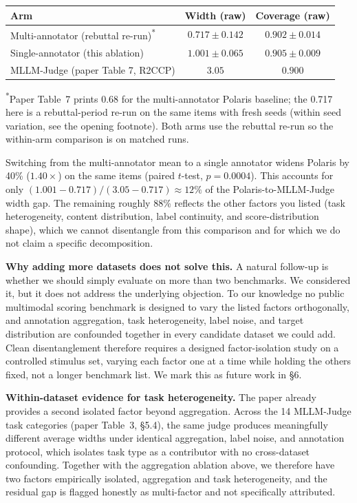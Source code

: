 \documentclass[11pt]{article}
\begin{document}
\begin{center}
\small
\begin{tabular}{lcc}
\toprule
\textbf{Arm} & \textbf{Width (raw)} & \textbf{Coverage (raw)} \\
\midrule
Multi-annotator (rebuttal re-run)\textsuperscript{*} & $0.717 \pm 0.142$ & $0.902 \pm 0.014$ \\
Single-annotator (this ablation)                     & $1.001 \pm 0.065$ & $0.905 \pm 0.009$ \\
MLLM-Judge (paper Table 7, R2CCP)                    & $3.05$            & $0.900$ \\
\bottomrule
\end{tabular}
\end{center}
\footnotesize\textsuperscript{*}Paper Table~7 prints 0.68 for the multi-annotator Polaris baseline; the 0.717 here is a rebuttal-period re-run on the same items with fresh seeds (within seed variation, see the opening footnote). Both arms use the rebuttal re-run so the within-arm comparison is on matched runs.\normalsize

Switching from the multi-annotator mean to a single annotator widens Polaris by 40\% ($1.40\times$) on the same items (paired $t$-test, $p = 0.0004$). This accounts for only $(1.001 - 0.717)/(3.05 - 0.717) \approx 12\%$ of the Polaris-to-MLLM-Judge width gap. The remaining roughly 88\% reflects the other factors you listed (task heterogeneity, content distribution, label continuity, and score-distribution shape), which we cannot disentangle from this comparison and for which we do not claim a specific decomposition.

\textbf{Why adding more datasets does not solve this.} A natural follow-up is whether we should simply evaluate on more than two benchmarks. We considered it, but it does not address the underlying objection. To our knowledge no public multimodal scoring benchmark is designed to vary the listed factors orthogonally, and annotation aggregation, task heterogeneity, label noise, and target distribution are confounded together in every candidate dataset we could add. Clean disentanglement therefore requires a designed factor-isolation study on a controlled stimulus set, varying each factor one at a time while holding the others fixed, not a longer benchmark list. We mark this as future work in \S 6.

\textbf{Within-dataset evidence for task heterogeneity.} The paper already provides a second isolated factor beyond aggregation. Across the 14 MLLM-Judge task categories (paper Table~3, \S 5.4), the same judge produces meaningfully different average widths under identical aggregation, label noise, and annotation protocol, which isolates task type as a contributor with no cross-dataset confounding. Together with the aggregation ablation above, we therefore have two factors empirically isolated, aggregation and task heterogeneity, and the residual gap is flagged honestly as multi-factor and not specifically attributed.
\end{document}
